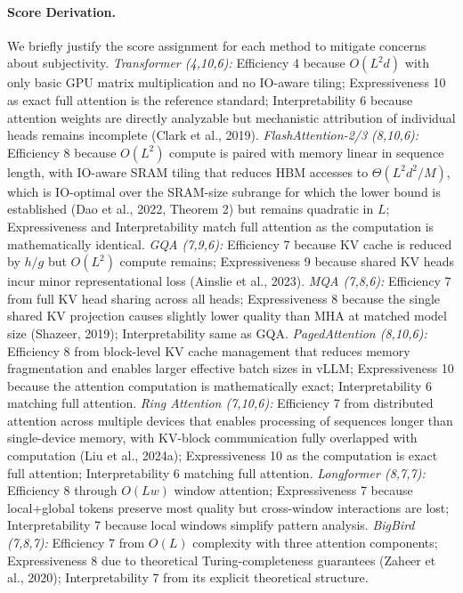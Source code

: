 \documentclass[10pt,twocolumn]{article}
\begin{document}
\paragraph{Score Derivation.}
We briefly justify the score assignment for each method to mitigate concerns about subjectivity.
\textit{Transformer (4,10,6):} Efficiency 4 because $O(L^2 d)$ with only basic GPU matrix multiplication and no IO-aware tiling; Expressiveness 10 as exact full attention is the reference standard; Interpretability 6 because attention weights are directly analyzable but mechanistic attribution of individual heads remains incomplete (Clark et al., 2019).
\textit{FlashAttention-2/3 (8,10,6):} Efficiency 8 because $O(L^2)$ compute is paired with memory linear in sequence length, with IO-aware SRAM tiling that reduces HBM accesses to $\Theta(L^2d^2/M)$, which is IO-optimal over the SRAM-size subrange for which the lower bound is established (Dao et al., 2022, Theorem 2) but remains quadratic in $L$; Expressiveness and Interpretability match full attention as the computation is mathematically identical.
\textit{GQA (7,9,6):} Efficiency 7 because KV cache is reduced by $h/g$ but $O(L^2)$ compute remains; Expressiveness 9 because shared KV heads incur minor representational loss (Ainslie et al., 2023).
\textit{MQA (7,8,6):} Efficiency 7 from full KV head sharing across all heads; Expressiveness 8 because the single shared KV projection causes slightly lower quality than MHA at matched model size (Shazeer, 2019); Interpretability same as GQA.
\textit{PagedAttention (8,10,6):} Efficiency 8 from block-level KV cache management that reduces memory fragmentation and enables larger effective batch sizes in vLLM; Expressiveness 10 because the attention computation is mathematically exact; Interpretability 6 matching full attention.
\textit{Ring Attention (7,10,6):} Efficiency 7 from distributed attention across multiple devices that enables processing of sequences longer than single-device memory, with KV-block communication fully overlapped with computation (Liu et al., 2024a); Expressiveness 10 as the computation is exact full attention; Interpretability 6 matching full attention.
\textit{Longformer (8,7,7):} Efficiency 8 through $O(Lw)$ window attention; Expressiveness 7 because local+global tokens preserve most quality but cross-window interactions are lost; Interpretability 7 because local windows simplify pattern analysis.
\textit{BigBird (7,8,7):} Efficiency 7 from $O(L)$ complexity with three attention components; Expressiveness 8 due to theoretical Turing-completeness guarantees (Zaheer et al., 2020); Interpretability 7 from its explicit theoretical structure.
\end{document}
